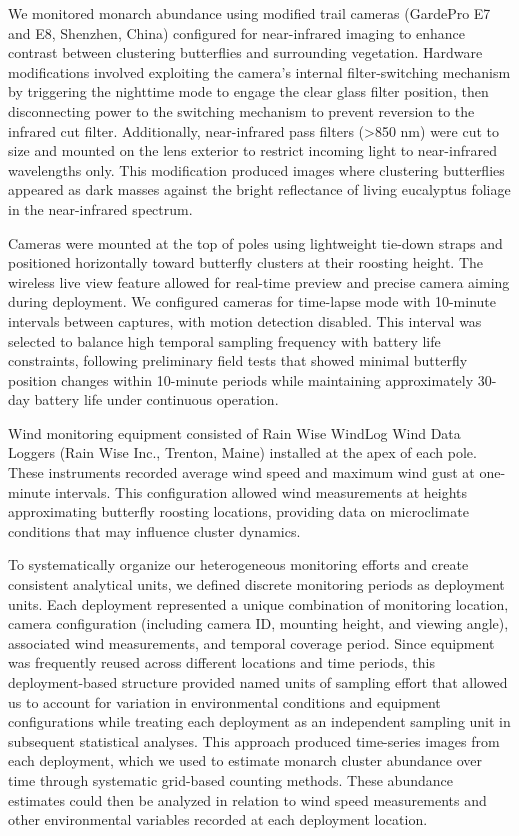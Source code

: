 We monitored monarch abundance using modified trail cameras (GardePro E7 and E8, Shenzhen, China) configured for near-infrared imaging to enhance contrast between clustering butterflies and surrounding vegetation. Hardware modifications involved exploiting the camera's internal filter-switching mechanism by triggering the nighttime mode to engage the clear glass filter position, then disconnecting power to the switching mechanism to prevent reversion to the infrared cut filter. Additionally, near-infrared pass filters (>850 nm) were cut to size and mounted on the lens exterior to restrict incoming light to near-infrared wavelengths only. This modification produced images where clustering butterflies appeared as dark masses against the bright reflectance of living eucalyptus foliage in the near-infrared spectrum.

Cameras were mounted at the top of poles using lightweight tie-down straps and positioned horizontally toward butterfly clusters at their roosting height. The wireless live view feature allowed for real-time preview and precise camera aiming during deployment. We configured cameras for time-lapse mode with 10-minute intervals between captures, with motion detection disabled. This interval was selected to balance high temporal sampling frequency with battery life constraints, following preliminary field tests that showed minimal butterfly position changes within 10-minute periods while maintaining approximately 30-day battery life under continuous operation.

Wind monitoring equipment consisted of Rain Wise WindLog Wind Data Loggers (Rain Wise Inc., Trenton, Maine) installed at the apex of each pole. These instruments recorded average wind speed and maximum wind gust at one-minute intervals. This configuration allowed wind measurements at heights approximating butterfly roosting locations, providing data on microclimate conditions that may influence cluster dynamics.

To systematically organize our heterogeneous monitoring efforts and create consistent analytical units, we defined discrete monitoring periods as deployment units. Each deployment represented a unique combination of monitoring location, camera configuration (including camera ID, mounting height, and viewing angle), associated wind measurements, and temporal coverage period. Since equipment was frequently reused across different locations and time periods, this deployment-based structure provided named units of sampling effort that allowed us to account for variation in environmental conditions and equipment configurations while treating each deployment as an independent sampling unit in subsequent statistical analyses. This approach produced time-series images from each deployment, which we used to estimate monarch cluster abundance over time through systematic grid-based counting methods. These abundance estimates could then be analyzed in relation to wind speed measurements and other environmental variables recorded at each deployment location.

